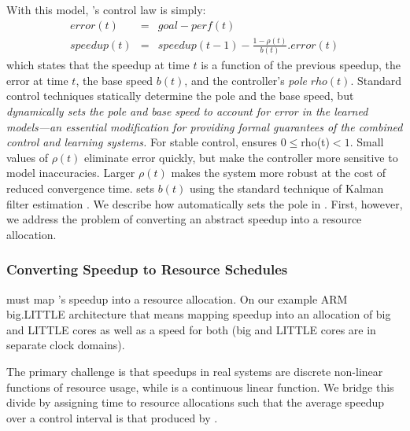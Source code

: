 With this model, \SYSTEM{}'s control law is simply:
\begin{eqnarray}
  error(t) &=& goal - perf(t) \label{eqn:speedup-error} \\
  speedup(t) &=& speedup(t-1) - \frac{1 - \rho(t)}{b(t)}.error(t)
  \label{eqn:speedup-control}
\end{eqnarray}
which states that the speedup at time $t$ is a function of the
previous speedup, the error at time $t$, the base speed $b(t)$, and
the controller's \emph{pole} $rho(t)$.  Standard control techniques
statically determine the pole and the base speed, but \SYSTEM{}
\emph{dynamically sets the pole and base speed to account for error in
  the learned models---an essential modification for providing formal
  guarantees of the combined control and learning systems.}  For
stable control, \SYSTEM{} ensures $0 \le $rho(t)$ < 1$. Small values
of $\rho(t)$ eliminate error quickly, but make the controller more
sensitive to model inaccuracies.  Larger $\rho(t)$ makes the system
more robust at the cost of reduced convergence time.  \SYSTEM{} sets
$b(t)$ using the standard technique of Kalman filter estimation
\cite{whelch2006kalman}. We describe how \SYSTEM{} automatically sets
the pole in .  First, however, we address the
problem of converting an abstract speedup into a resource allocation.

\subsubsection{Converting Speedup to Resource Schedules}
\SYSTEM{} must map 's speedup into a resource
allocation.  On our example ARM big.LITTLE architecture that means
mapping speedup into an allocation of big and LITTLE cores as well as
a speed for both (big and LITTLE cores are in separate clock domains).

The primary challenge is that speedups in real systems are discrete
non-linear functions of resource usage, while 
is a continuous linear function.  We bridge this divide by assigning
time to resource allocations such that the average speedup over a
control interval is that produced by .

